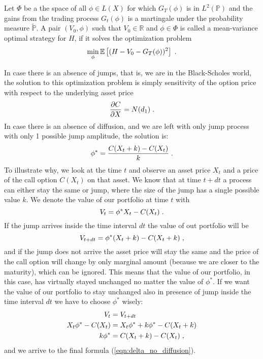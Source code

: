 \documentclass[times, utf8, diplomski]{fer}
\begin{document}
\begin{definition} \label{def:mean_variance_hedge}
	Let $\Phi$ be a the space of all $\phi \in L(X)$ for which $G_T(\phi)$ is in $L^2(\mathbb{P})$ and the gains from the trading process $G_t(\phi)$ is a martingale under the probability measure $\tilde{\mathbb{P}}$. A pair $(V_0, \phi)$ such that $V_0 \in \mathbb{R}$ and $\phi \in \Phi$ is called a mean-variance optimal strategy for $H$, if it solves the optimization problem 
	\begin{equation} \label{eqn:min_hedge_error}
		\min_{\phi}\mathbb{E}\left[ (H - V_0 - G_T(\phi))^2 \right] \hspace{0.1cm}.
	\end{equation}
\end{definition}
\noindent In case there is an absence of jumps, that is, we are in the Black-Scholes world, the solution to this optimization problem is simply sensitivity of the option price with respect to the underlying asset price
\begin{equation*}
	\frac{\partial C}{\partial X} = N(d_1) \hspace{0.1cm}.
\end{equation*}
In case there is an absence of diffusion, and we are left with only jump process with only 1 possible jump amplitude, the solution is:
\begin{equation} \label{eqn:delta_no_diffusion}
	\phi^* = \frac{C(X_t + k) - C(X_t)}{k} \hspace{0.1cm}.
\end{equation}
To illustrate why, we look at the time $t$ and observe an asset price $X_t$ and a price of the call option $C(X_t)$ on that asset. We know that at time $t+dt$ a process can either stay the same or jump, where the size of the jump has a single possible value $k$. We denote the value of our portfolio at time $t$ with $$V_t = \phi^* X_t - C(X_t) \hspace{0.1cm}.$$ If the jump arrives inside the time interval $dt$ the value of out portfolio will be
$$V_{t+dt} = \phi^* (X_t + k) - C(X_t + k) \hspace{0.1cm},$$
and if the jump does not arrive the asset price will stay the same and the price of the call option will change by only marginal amount (because we are closer to the maturity), which can be ignored. This means that the value of our portfolio, in this case, has virtually stayed unchanged no matter the value of $\phi^*$. If we want the value of our portfolio to stay unchanged also in presence of jump inside the time interval $dt$ we have to choose $\phi^*$ wisely:
\begin{align*}
	V_t &= V_{t+dt} \\
	X_t\phi^* - C(X_t) &=  X_t\phi^*+ k\phi^* - C(X_t + k) \\
	k\phi^* &= C(X_t + k) - C(X_t) \hspace{0.1cm},
\end{align*} and we arrive to the final formula (\ref{eqn:delta_no_diffusion}).
\end{document}
